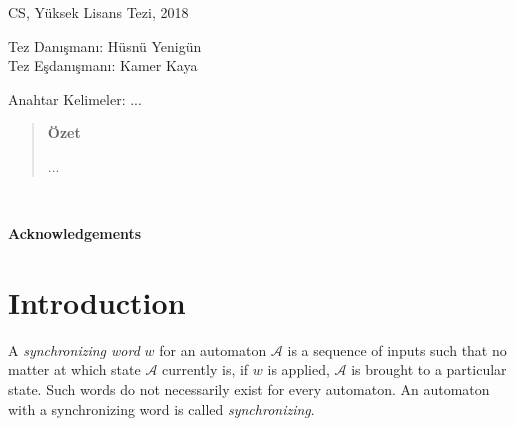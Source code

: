 \documentclass[12pt]{article}
\begin{document}
\begin{center}
\MyAuthor

CS, Y\"{u}ksek Lisans Tezi, 2018

Tez Dan{\i}\c{s}man{\i}: H\"{u}sn\"{u} Yenig\"{u}n\\
Tez E\c{s}dan{\i}\c{s}man{\i}: Kamer Kaya
\end{center}

\begin{center}
Anahtar Kelimeler: ...
\end{center}

\begin{quote}
\begin{center}
{\bf \"{O}zet}
\end{center}

...

\end{quote}
\clearpage
$ $
\vspace{2cm}
\begin{center}
\textbf{Acknowledgements}
\end{center}



\clearpage
\tableofcontents

\clearpage 
\listoffigures

\clearpage
\listoftables

\clearpage
\listofalgorithms

\clearpage
\section{Introduction}
\label{sec:Intro}

A {\em synchronizing word} $w$ for an automaton $\mathcal{A}$ is a sequence of inputs such that no matter at which state $\mathcal{A}$ currently is, if $w$ is applied, $\mathcal{A}$ is brought to a particular state. Such words do not necessarily exist for every automaton. An automaton with a synchronizing word is called {\em synchronizing}.
\end{document}
